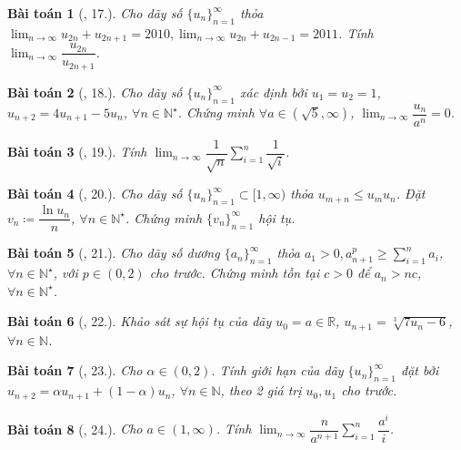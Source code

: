 \documentclass{article}
\newtheorem{baitoan}{Bài toán}
\begin{document}
\begin{baitoan}[\cite{TLCT_dai_so_giai_tich_11}, 17.]
	Cho dãy số $\{u_n\}_{n=1}^\infty$ thỏa $\lim_{n\to\infty} u_{2n} + u_{2n+1} = 2010,\lim_{n\to\infty} u_{2n} + u_{2n-1} = 2011$. Tính $\lim_{n\to\infty} \dfrac{u_{2n}}{u_{2n+1}}$.
\end{baitoan}

\begin{baitoan}[\cite{TLCT_dai_so_giai_tich_11}, 18.]
	Cho dãy số $\{u_n\}_{n=1}^\infty$ xác định bởi $u_1 = u_2 = 1$, $u_{n+2} = 4u_{n+1} - 5u_n$, $\forall n\in\mathbb{N}^\star$. Chứng minh $\forall a\in(\sqrt{5},\infty)$, $\lim_{n\to\infty} \dfrac{u_n}{a^n} = 0$. 
\end{baitoan}

\begin{baitoan}[\cite{TLCT_dai_so_giai_tich_11}, 19.]
	Tính $\lim_{n\to\infty} \dfrac{1}{\sqrt{n}}\sum_{i=1}^n \dfrac{1}{\sqrt{i}}$.
\end{baitoan}

\begin{baitoan}[\cite{TLCT_dai_so_giai_tich_11}, 20.]
	Cho dãy số $\{u_n\}_{n=1}^\infty\subset[1,\infty)$ thỏa $u_{m+n}\le u_mu_n$. Đặt $v_n\coloneqq\dfrac{\ln u_n}{n}$, $\forall n\in\mathbb{N}^\star$. Chứng minh $\{v_n\}_{n=1}^\infty$ hội tụ.
\end{baitoan}

\begin{baitoan}[\cite{TLCT_dai_so_giai_tich_11}, 21.]
	Cho dãy số dương $\{a_n\}_{n=1}^\infty$ thỏa $a_1 > 0,a_{n+1}^p\ge\sum_{i=1}^n a_i$, $\forall n\in\mathbb{N}^\star$, với $p\in(0,2)$ cho trước. Chứng minh tồn tại $c > 0$ để $a_n > nc$, $\forall n\in\mathbb{N}^\star$.
\end{baitoan}

\begin{baitoan}[\cite{TLCT_dai_so_giai_tich_11}, 22.]
	Khảo sát sự hội tụ của dãy $u_0 = a\in\mathbb{R}$, $u_{n+1} = \sqrt[3]{7u_n - 6}$, $\forall n\in\mathbb{N}$.
\end{baitoan}

\begin{baitoan}[\cite{TLCT_dai_so_giai_tich_11}, 23.]
	Cho $\alpha\in(0,2)$. Tính giới hạn của dãy $\{u_n\}_{n=1}^\infty$ đặt bởi $u_{n+2} = \alpha u_{n+1} + (1 - \alpha)u_n$, $\forall n\in\mathbb{N}$, theo 2 giá trị $u_0,u_1$ cho trước.
\end{baitoan}

\begin{baitoan}[\cite{TLCT_dai_so_giai_tich_11}, 24.]
	Cho $a\in(1,\infty)$. Tính $\lim_{n\to\infty} \dfrac{n}{a^{n+1}}\sum_{i=1}^n \dfrac{a^i}{i}$.
\end{baitoan}
\end{document}
